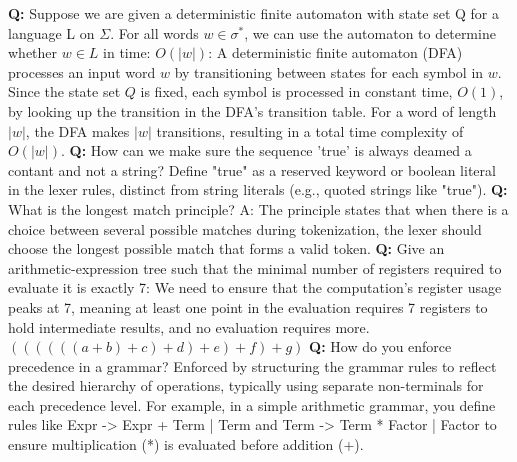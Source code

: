 \textbf{Q:} Suppose we are given a deterministic finite automaton with state set Q for a language L on $\Sigma$. For all words $w \in \sigma^*$, we can use the automaton to determine whether $w \in L$ in time: $O( \vert w \vert )$: A deterministic finite automaton (DFA) processes an input word $ w $ by transitioning between states for each symbol in $ w $. Since the state set $ Q $ is fixed, each symbol is processed in constant time, $ O(1) $, by looking up the transition in the DFA's transition table. For a word of length $  \vert w \vert  $, the DFA makes $  \vert w \vert  $ transitions, resulting in a total time complexity of $ O( \vert w \vert ) $.
\textbf{Q:} How can we make sure the sequence 'true' is always deamed a contant and not a string? Define "true" as a reserved keyword or boolean literal in the lexer rules, distinct from string literals (e.g., quoted strings like "true").
\textbf{Q:} What is the longest match principle?
A: The principle states that when there is a choice between several possible matches during tokenization, the lexer should choose the longest possible match that forms a valid token.
\textbf{Q:} Give an arithmetic-expression tree such that the minimal number of registers required to evaluate it is exactly 7: We need to ensure that the computation's register usage peaks at 7, meaning at least one point in the evaluation requires 7 registers to hold intermediate results, and no evaluation requires more. $((((((a + b) + c) + d) + e) + f) + g)$
\textbf{Q:} How do you enforce precedence in a grammar? Enforced by structuring the grammar rules to reflect the desired hierarchy of operations, typically using separate non-terminals for each precedence level. For example, in a simple arithmetic grammar, you define rules like Expr -> Expr + Term | Term and Term -> Term * Factor | Factor to ensure multiplication (*) is evaluated before addition (+).